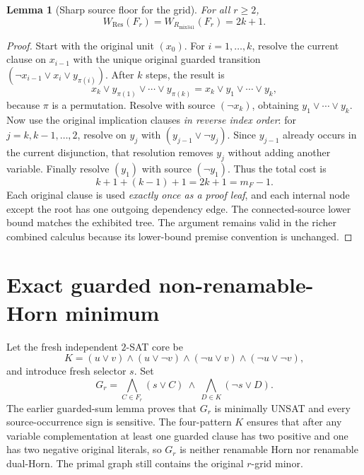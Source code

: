 \documentclass[11pt]{article}
\newtheorem{lemma}{Lemma}
\begin{document}
\begin{lemma}[Sharp source floor for the grid]
For all $r\ge2$,
\[
\boxed{W_{\mathrm{Res}}(F_r)=W_{R_{\mathrm{mix341}}}(F_r)=2k+1.}
\]
\end{lemma}
\begin{proof}
Start with the original unit $(x_0)$. For $i=1,\ldots,k$, resolve the current clause on $x_{i-1}$ with the unique original guarded transition
$(\neg x_{i-1}\vee x_i\vee y_{\pi(i)})$. After $k$ steps, the result is
\[
x_k\vee y_{\pi(1)}\vee\cdots\vee y_{\pi(k)}
=x_k\vee y_1\vee\cdots\vee y_k,
\]
because $\pi$ is a permutation. Resolve with source $(\neg x_k)$, obtaining $y_1\vee\cdots\vee y_k$. Now use the original implication clauses \emph{in reverse index order}: for $j=k,k-1,\ldots,2$, resolve on $y_j$ with $(y_{j-1}\vee\neg y_j)$. Since $y_{j-1}$ already occurs in the current disjunction, that resolution removes $y_j$ without adding another variable. Finally resolve $(y_1)$ with source $(\neg y_1)$. Thus the total cost is
\[
k+1+(k-1)+1=2k+1=m_F-1.
\]
Each original clause is used \emph{exactly once as a proof leaf}, and each internal node except the root has one outgoing dependency edge. The connected-source lower bound matches the exhibited tree. The argument remains valid in the richer combined calculus because its lower-bound premise convention is unchanged.
\end{proof}

\section*{Exact guarded non-renamable-Horn minimum}
Let the fresh independent $2$-SAT core be
\[
K=(u\vee v)\wedge(u\vee\neg v)\wedge(\neg u\vee v)\wedge(\neg u\vee\neg v),
\]
and introduce fresh selector $s$. Set
\[
G_r=\bigwedge_{C\in F_r}(s\vee C)\ \wedge\
\bigwedge_{D\in K}(\neg s\vee D).
\]
The earlier guarded-sum lemma proves that $G_r$ is minimally UNSAT and every source-occurrence sign is sensitive. The four-pattern $K$ ensures that after any variable complementation at least one guarded clause has two positive and one has two negative original literals, so $G_r$ is neither renamable Horn nor renamable dual-Horn. The primal graph still contains the original $r$-grid minor.
\end{document}
